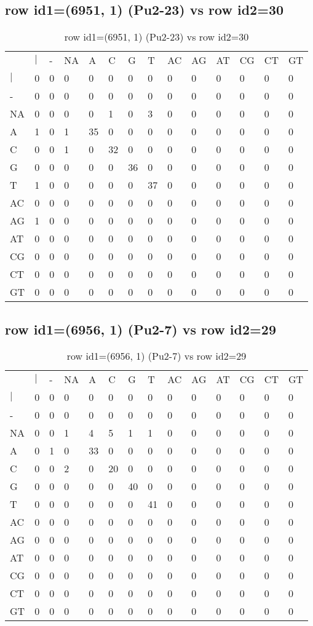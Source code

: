 \subsection{row id1=(6951, 1) (Pu2-23) vs row id2=30}
\begin{center}
\begin{longtable}{|l|l|l|l|l|l|l|l|l|l|l|l|l|l|}
\caption{row id1=(6951, 1) (Pu2-23) vs row id2=30} \label{table_dm154}\\
\hline
\\
\hline
&$|$&-&NA&A&C&G&T&AC&AG&AT&CG&CT&GT\\
$|$&0&0&0&0&0&0&0&0&0&0&0&0&0\\
-&0&0&0&0&0&0&0&0&0&0&0&0&0\\
NA&0&0&0&0&1&0&3&0&0&0&0&0&0\\
A&1&0&1&35&0&0&0&0&0&0&0&0&0\\
C&0&0&1&0&32&0&0&0&0&0&0&0&0\\
G&0&0&0&0&0&36&0&0&0&0&0&0&0\\
T&1&0&0&0&0&0&37&0&0&0&0&0&0\\
AC&0&0&0&0&0&0&0&0&0&0&0&0&0\\
AG&1&0&0&0&0&0&0&0&0&0&0&0&0\\
AT&0&0&0&0&0&0&0&0&0&0&0&0&0\\
CG&0&0&0&0&0&0&0&0&0&0&0&0&0\\
CT&0&0&0&0&0&0&0&0&0&0&0&0&0\\
GT&0&0&0&0&0&0&0&0&0&0&0&0&0\\
\hline
\end{longtable}
\end{center}

\subsection{row id1=(6956, 1) (Pu2-7) vs row id2=29}
\begin{center}
\begin{longtable}{|l|l|l|l|l|l|l|l|l|l|l|l|l|l|}
\caption{row id1=(6956, 1) (Pu2-7) vs row id2=29} \label{table_dm156}\\
\hline
\\
\hline
&$|$&-&NA&A&C&G&T&AC&AG&AT&CG&CT&GT\\
$|$&0&0&0&0&0&0&0&0&0&0&0&0&0\\
-&0&0&0&0&0&0&0&0&0&0&0&0&0\\
NA&0&0&1&4&5&1&1&0&0&0&0&0&0\\
A&0&1&0&33&0&0&0&0&0&0&0&0&0\\
C&0&0&2&0&20&0&0&0&0&0&0&0&0\\
G&0&0&0&0&0&40&0&0&0&0&0&0&0\\
T&0&0&0&0&0&0&41&0&0&0&0&0&0\\
AC&0&0&0&0&0&0&0&0&0&0&0&0&0\\
AG&0&0&0&0&0&0&0&0&0&0&0&0&0\\
AT&0&0&0&0&0&0&0&0&0&0&0&0&0\\
CG&0&0&0&0&0&0&0&0&0&0&0&0&0\\
CT&0&0&0&0&0&0&0&0&0&0&0&0&0\\
GT&0&0&0&0&0&0&0&0&0&0&0&0&0\\
\hline
\end{longtable}
\end{center}

